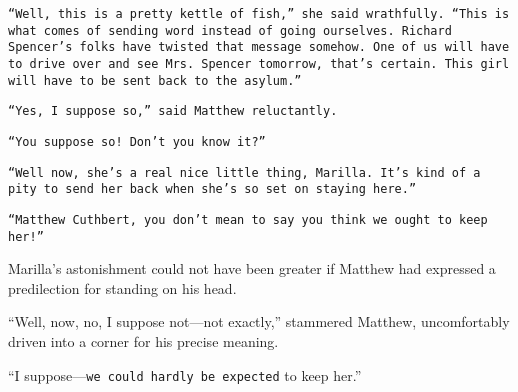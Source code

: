\documentclass[a4paper]{article}
\begin{document}
\texttt{``Well, this is a pretty kettle of fish,'' she said wrathfully. ``This is what comes of sending word instead of going ourselves. Richard Spencer's folks have twisted that message somehow. One of us will have to drive over and see Mrs. Spencer tomorrow, that's certain. This girl will have to be sent back to the asylum.''}

\texttt{``Yes, I suppose so,'' said Matthew reluctantly.}

\texttt{``You suppose so! Don't you know it?''}

\texttt{``Well now, she's a real nice little thing, Marilla. It's kind of a pity to send her back when she's so set on staying here.''}

\texttt{``Matthew Cuthbert, you don't mean to say you think we ought to keep her!''}

Marilla's astonishment \textsf{could not have been greater} if Matthew had expressed a predilection for standing on his head.

``Well, now, no, I suppose not---not exactly,'' stammered Matthew, \textrm{uncomfortably driven into a corner} for his precise meaning. 

``I suppose---\texttt{we could hardly be expected} to keep her.''
\end{document}
